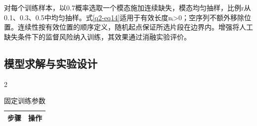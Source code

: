 对每个训练样本，以0.7概率选取一个模态施加连续缺失，模态均匀抽样，比例r从0.1、0.3、0.5中均匀抽样。式\eqref{q2-eq14}适用于有效长度nᵢ\textgreater0；空序列不额外移除位置。连续性按有效位置的顺序定义，随机起点保证所选片段在边界内。增强将人工缺失条件下的监督风险纳入训练，其效果通过消融实验评价。

\hypertarget{q2-ux6a21ux578bux6c42ux89e3ux4e0eux5b9eux9a8cux8bbeux8ba1}{%
\subsection{模型求解与实验设计}\label{q2-ux6a21ux578bux6c42ux89e3ux4e0eux5b9eux9a8cux8bbeux8ba1}}

\begin{PaperTable}{2}

\begin{table}[!htbp]
\centering\caption{固定训练参数\label{q2-tab3}}
\begin{tabular}{@{}ll@{}}
\toprule
\begin{minipage}[b]{\dimexpr 0.080000\linewidth-0.160000\tabcolsep\relax}\raggedleft
步骤\strut
\end{minipage} & \begin{minipage}[b]{\dimexpr 0.920000\linewidth-1.840000\tabcolsep\relax}\raggedright
操作\strut
\end{minipage}\tabularnewline
\midrule


\end{tabular}
\end{table}
\end{PaperTable}
